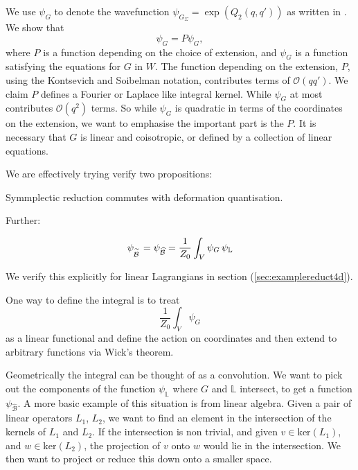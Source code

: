     \begin{rem}
    We use \( \psi_G\) to denote the wavefunction \(  \psi_{G_\Sigma} =\exp(Q_2(q,q')) \) as written in \cite[p. 53]{ks_airy}. We show that 
    \begin{equation} 
    \label{eqn:psiextg}
    \psi_G = P \psi_G,
    \end{equation} 
    where \(P\) is a function depending on the choice of extension, and \( \psi_G\) is a function satisfying the equations for \(G\) in \(W\). The function depending on the extension, \(P\), using the Kontsevich and Soibelman notation, contributes terms of \( \mathcal{O}( q q')\). We claim \(P\) defines a Fourier or Laplace like integral kernel. While \( \psi_G\) at most contributes \(\mathcal{O}(q^2)\) terms. So while \( \psi_G\) is quadratic in terms of the coordinates on the extension, we want to emphasise the important part is the \(P\). It is necessary that \(G\) is linear and coisotropic, or defined by a collection of linear equations. 
    \end{rem}
    
    
    We are effectively trying verify two propositions:
    \begin{prop}
    Symmplectic reduction commutes with deformation quantisation.
    \end{prop}
    Further:
    \begin{prop}
    \[ \psi_{\overset{\sim}{\mathcal{B}\,}} = \psi_{\widehat{\mathcal{B}}} =\frac{1}{Z_0} \int_{V} \psi_G \,  \psi_{\mathbb{L}}\]
    \end{prop}
    We verify this explicitly for linear Lagrangians in section (\ref{sec:examplereduct4d}).

    One way to define the integral is to treat 
    \[ \frac{1}{Z_0} \int_{V} \psi_G\]
    as a linear functional and define the action on coordinates and then extend to arbitrary functions via Wick's theorem. 
    
    Geometrically the integral can be thought of as a convolution. We want to pick out the components of the function \( \psi_{\mathbb{L}}\) where \(G\) and \( \mathbb{L}\) intersect, to get a function \( \psi_{\widehat{\mathcal{B}}}\). A more basic example of this situation is from linear algebra. Given a pair of linear operators \(L_1\), \(L_2\), we want to find an element in the intersection of the kernels of \(L_1\) and \(L_2\). If the intersection is non trivial, and given \( v \in \mathrm{ker}(L_1)\), and \( w \in \mathrm{ker}(L_2)\), the projection of \(v\) onto \(w\) would lie in the intersection. We then want to project or reduce this down onto a smaller space.
    
